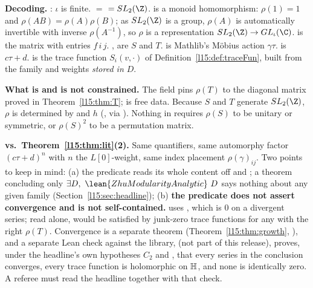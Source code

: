 \begin{dictionary}
\textbf{Decoding.} \lean{[Fintype ι]}: $\iota$ is finite.  $=$ 
$=\lfifteenSL$.  is a monoid homomorphism: $\rho(1)=1$ and $\rho(AB)=\rho(A)\rho(B)$; as $\lfifteenSL$ is a group,
$\rho(A)$ is automatically invertible with inverse $\rho(A^{-1})$, so $\rho$ is a representation $\lfifteenSL\to GL_\iota(\C)$.
 is the matrix with entries $f\,i\,j$. ,  are $S$ and $T$.
 is Mathlib's Möbius action $\gamma\tau$.  is $c\tau+d$.  is the
trace function $S_i(v,\cdot)$ of Definition~\ref{l15:def:traceFun}, built from the family and weights \emph{stored in $D$}.

\textbf{What is and is not constrained.} The field  pins $\rho(T)$ to the diagonal matrix proved in
Theorem~\ref{l15:thm:T};  is free data. Because $S$ and $T$ generate $\lfifteenSL$, $\rho$ is determined by
 and $h$ (\allowbreak{}, via ). Nothing in 
requires $\rho(S)$ to be unitary or symmetric, or $\rho(S)^2$ to be a permutation matrix.

\textbf{ vs.\ Theorem~\ref{l15:thm:lit}(2).} Same quantifiers, same automorphy factor
$(c\tau+d)^n$ with $n$ the $L[0]$-weight, same index placement $\rho(\gamma)_{ij}$. Two points to keep in mind:
(a) the predicate reads its whole content off  and ; a theorem concluding only
$\exists D,\ \lean{ZhuModularityAnalytic}\ D$ says nothing about any given family (Section~\ref{l15:sec:headline});
(b) \textbf{the predicate does not assert convergence and is not self-contained.}  uses , which is
$0$ on a divergent series; read alone,  would be satisfied by junk-zero trace functions for any
 with the right $\rho(T)$. Convergence is a separate theorem (Theorem~\ref{l15:thm:growth},
), and a separate Lean check against the library,  (not
part of this release), proves, under the
headline's own hypotheses $C_2$ and , that every series in the conclusion converges, every trace function is
holomorphic on $\mathbb{H}$, and none is identically zero. A referee must read the headline together with that check.
\end{dictionary}

